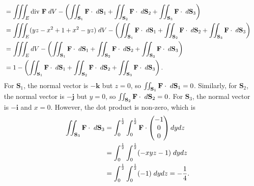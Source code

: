 \documentclass{article}
\begin{document}
\begin{enumerate}
\begin{enumerate}
\begin{align*}
            &= \iiint_E \text{div }\textbf{F} \hspace{1mm}dV - \left(\iint_{\textbf{S}_1} \textbf{F}\cdot \hspace{1mm}d\textbf{S}_1 + \iint_{\textbf{S}_2} \textbf{F}\cdot \hspace{1mm}d\textbf{S}_2 + \iint_{\textbf{S}_3} \textbf{F}\cdot \hspace{1mm}d\textbf{S}_3\right)\\
            &= \iiint_E (yz - x^2 + 1 + x^2 - yz) \hspace{1mm}dV - \left(\iint_{\textbf{S}_1} \textbf{F}\cdot \hspace{1mm}d\textbf{S}_1 + \iint_{\textbf{S}_2} \textbf{F}\cdot \hspace{1mm}d\textbf{S}_2 + \iint_{\textbf{S}_3} \textbf{F}\cdot \hspace{1mm}d\textbf{S}_3\right)\\
            &= \iiint_E dV - \left(\iint_{\textbf{S}_1} \textbf{F}\cdot \hspace{1mm}d\textbf{S}_1 + \iint_{\textbf{S}_2} \textbf{F}\cdot \hspace{1mm}d\textbf{S}_2 + \iint_{\textbf{S}_3} \textbf{F}\cdot \hspace{1mm}d\textbf{S}_3\right)\\
            &= 1 - \left(\iint_{\textbf{S}_1} \textbf{F}\cdot \hspace{1mm}d\textbf{S}_1 + \iint_{\textbf{S}_2} \textbf{F}\cdot \hspace{1mm}d\textbf{S}_2 + \iint_{\textbf{S}_3} \textbf{F}\cdot \hspace{1mm}d\textbf{S}_3\right).\\
        \end{align*}
        For $\textbf{S}_1$, the normal vector is $-\textbf{k}$ but $z = 0$, so $\iint_{\textbf{S}_1} \textbf{F}\cdot \hspace{1mm}d\textbf{S}_1 = 0$. Similarly, for $\textbf{S}_2$, the normal vector is $-\textbf{j}$ but $y = 0$, so $\iint_{\textbf{S}_2} \textbf{F}\cdot \hspace{1mm}d\textbf{S}_2 = 0$. For $\textbf{S}_3$, the normal vector is $-\textbf{i}$ and $x = 0$. However, the dot product is non-zero, which is
        \begin{align*}
            \iint_{\textbf{S}_3} \textbf{F}\cdot \hspace{1mm}d\textbf{S}_3 &= \int_0^\frac{1}{2}\int_0^\frac{1}{2}\textbf{F}\cdot\begin{pmatrix}-1\\0\\0\end{pmatrix}dydz\\
            &= \int_0^\frac{1}{2}\int_0^\frac{1}{2}(-xyz-1)\hspace{1mm}dydz\\
            &= \int_0^\frac{1}{2}\int_0^\frac{1}{2}(-1)\hspace{1mm}dydz = -\frac{1}{4}.
        \end{align*}
        

\end{enumerate}
\end{enumerate}
\end{document}
